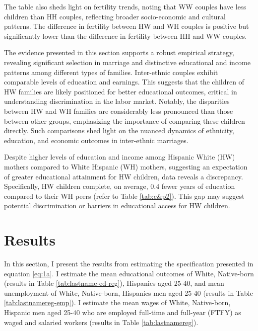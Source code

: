 The table also sheds light on fertility trends, noting that WW couples have less children than HH couples, reflecting broader socio-economic and cultural patterns. The difference in fertility between HW and WH couples is positive but significantly lower than the difference in fertility between HH and WW couples.

The evidence presented in this section supports a robust empirical strategy, revealing significant selection in marriage and distinctive educational and income patterns among different types of families. Inter-ethnic couples exhibit comparable levels of education and earnings. This suggests that the children of HW families are likely positioned for better educational outcomes, critical in understanding discrimination in the labor market. Notably, the disparities between HW and WH families are considerably less pronounced than those between other groups, emphasizing the importance of comparing these children directly. Such comparisons shed light on the nuanced dynamics of ethnicity, education, and economic outcomes in inter-ethnic marriages. 


Despite higher levels of education and income among Hispanic White (HW) mothers compared to White Hispanic (WH) mothers, suggesting an expectation of greater educational attainment for HW children, data reveals a discrepancy. Specifically, HW children complete, on average, 0.4 fewer years of education compared to their WH peers (refer to Table \ref{tab:c&p2}). This gap may suggest potential discrimination or barriers in educational access for HW children.

\section{Results}\label{sec:results}

In this section, I present the results from estimating the specification presented in equation \ref{eq:1a}. I estimate the mean educational outcomes of White, Native-born (results in Table \ref{tab:lastname-ed-reg}), Hispanics aged 25-40, and mean unemployment of White, Native-born, Hispanics men aged 25-40 (results in Table \ref{tab:lastnamereg-emp}). I estimate the mean wages of White, Native-born, Hispanic men aged 25-40 who are employed full-time and full-year (FTFY) as waged and salaried workers (results in Table \ref{tab:lastnamereg}).

